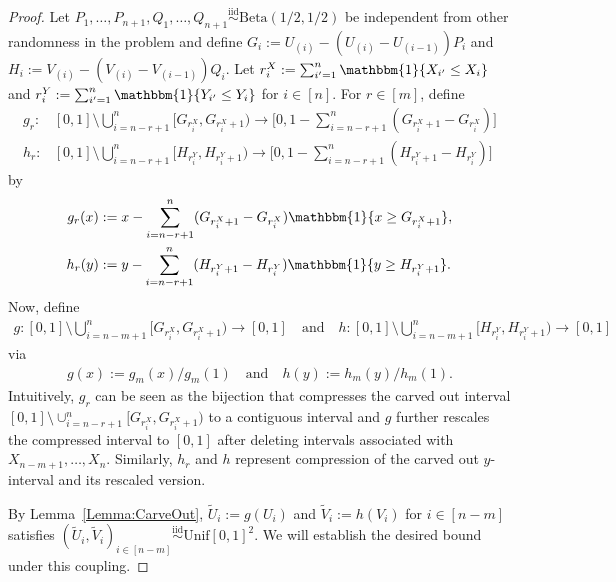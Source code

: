 \documentclass[11pt]{article}
\newcommand{\iid}{\stackrel{\mathrm{iid}}\sim}
\begin{document}
\begin{proof}
Let $P_1,\ldots,P_{n+1},Q_1,\ldots,Q_{n+1}\iid \mathrm{Beta}(1/2,1/2)$ be independent from other randomness in the problem and define $G_i:=U_{(i)}-(U_{(i)}-U_{(i-1)})P_i$ and $H_i:=V_{(i)}-(V_{(i)}-V_{(i-1)})Q_i$. Let $r^X_i:=\sum_{i'=1}^n\mathbbm{1}\{X_{i'}\leq X_i\}$ and $r^Y_i:=\sum_{i'=1}^n\mathbbm{1}\{Y_{i'}\leq Y_i\}$ for $i\in[n]$. For $r\in[m]$, define
\begin{align*}
g_r: {}&[0,1]\setminus \bigcup_{i=n-r+1}^{n} [G_{r^X_i}, G_{r^X_i+1}) \to \biggl[0,1 - \sum_{i=n-r+1}^{n} (G_{r^X_i+1}-G_{r^X_i})\biggr]\\
h_r:{}&[0,1]\setminus \bigcup_{i=n-r+1}^{n} [H_{r^Y_i}, H_{r^Y_i+1}) \to \biggl[0,1 - \sum_{i=n-r+1}^{n} (H_{r^Y_i+1}-H_{r^Y_i})\biggr]
\end{align*}
by
\begin{align*}
g_r(x) &:= x-\sum_{i=n-r+1}^{n} (G_{r^X_i+1}-G_{r^X_i})\mathbbm{1}\{x\geq G_{r^X_i+1}\},\\
h_r(y) &:= y - \sum_{i=n-r+1}^{n} (H_{r^Y_i+1}-H_{r^Y_i})\mathbbm{1}\{y\geq H_{r^Y_i+1}\}.
\end{align*}
Now, define 
\begin{align*}
g:[0,1]\setminus\bigcup_{i=n-m+1}^{n} [G_{r^X_i}, G_{r^X_i+1}) \to [0,1]\quad\text{and}\quad h:[0,1]\setminus\bigcup_{i=n-m+1}^{n} [H_{r^Y_i}, H_{r^Y_i+1}) \to [0,1]
\end{align*}
via
\begin{align*}
    g(x):=g_m(x) / g_m(1) \quad \text{and}\quad 
    h(y):=h_m(y) / h_m(1).
\end{align*}
Intuitively, $g_r$ can be seen as the bijection that compresses the carved out interval $[0,1]\setminus \cup_{i=n-r+1}^{n} [G_{r^X_i}, G_{r^X_i+1})$ to a contiguous interval and $g$ further rescales the compressed interval to $[0,1]$ after deleting intervals associated with $X_{n-m+1},\ldots, X_{n}$. Similarly, $h_r$ and $h$ represent compression of the carved out $y$-interval and its rescaled version. 

By Lemma~\ref{Lemma:CarveOut}, $\tilde U_i := g(U_i)$ and $\tilde V_i:=h(V_i)$ for $i\in[n-m]$ satisfies $(\tilde U_i,\tilde V_i)_{i\in[n-m]} \iid\mathrm{Unif}[0,1]^2$. We will establish the desired bound under this coupling.


\end{proof}
\end{document}
